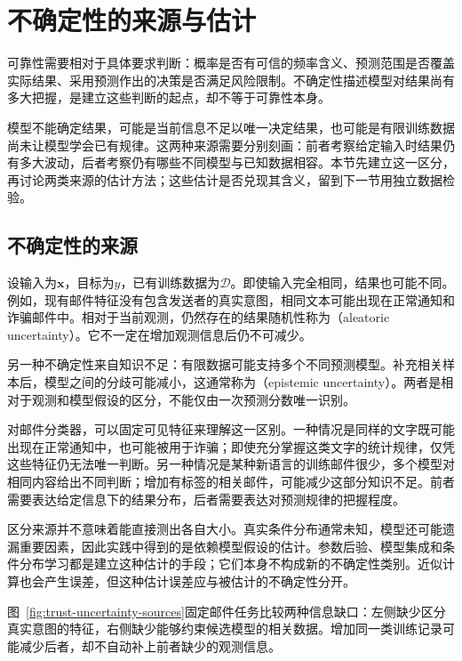 \section{不确定性的来源与估计}
\label{sec:reliability-uncertainty}

可靠性需要相对于具体要求判断：概率是否有可信的频率含义、预测范围是否覆盖实际结果、采用预测作出的决策是否满足风险限制。不确定性描述模型对结果尚有多大把握，是建立这些判断的起点，却不等于可靠性本身。

模型不能确定结果，可能是当前信息不足以唯一决定结果，也可能是有限训练数据尚未让模型学会已有规律。这两种来源需要分别刻画：前者考察给定输入时结果仍有多大波动，后者考察仍有哪些不同模型与已知数据相容。本节先建立这一区分，再讨论两类来源的估计方法；这些估计是否兑现其含义，留到下一节用独立数据检验。

\subsection{不确定性的来源}
\label{sec:reliability-uncertainty-sources}

设输入为$\bm{x}$，目标为$y$，已有训练数据为$\mathcal D$。即使输入完全相同，结果也可能不同。例如，现有邮件特征没有包含发送者的真实意图，相同文本可能出现在正常通知和诈骗邮件中。相对于当前观测，仍然存在的结果随机性称为（aleatoric uncertainty）。它不一定在增加观测信息后仍不可减少。

另一种不确定性来自知识不足：有限数据可能支持多个不同预测模型。补充相关样本后，模型之间的分歧可能减小，这通常称为（epistemic uncertainty）。两者是相对于观测和模型假设的区分，不能仅由一次预测分数唯一识别。

对邮件分类器，可以固定可见特征来理解这一区别。一种情况是同样的文字既可能出现在正常通知中，也可能被用于诈骗；即使充分掌握这类文字的统计规律，仅凭这些特征仍无法唯一判断。另一种情况是某种新语言的训练邮件很少，多个模型对相同内容给出不同判断；增加有标签的相关邮件，可能减少这部分知识不足。前者需要表达给定信息下的结果分布，后者需要表达对预测规律的把握程度。

区分来源并不意味着能直接测出各自大小。真实条件分布通常未知，模型还可能遗漏重要因素，因此实践中得到的是依赖模型假设的估计。参数后验、模型集成和条件分布学习都是建立这种估计的手段；它们本身不构成新的不确定性类别。近似计算也会产生误差，但这种估计误差应与被估计的不确定性分开。

图~\ref{fig:trust-uncertainty-sources}固定邮件任务比较两种信息缺口：左侧缺少区分真实意图的特征，右侧缺少能够约束候选模型的相关数据。增加同一类训练记录可能减少后者，却不自动补上前者缺少的观测信息。

